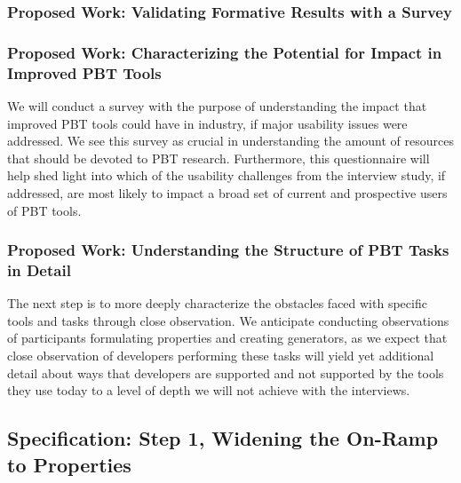 
\subsubsection{Proposed Work: Validating Formative Results with a Survey}

\subsubsection{Proposed Work: Characterizing the Potential for Impact in Improved PBT Tools}
We will conduct a survey with the purpose of understanding the impact that
improved PBT tools could have in industry, if major usability issues were
addressed. We see this survey as crucial in understanding the amount of
resources that should be devoted to PBT research. Furthermore, this
questionnaire will help shed light into which of the usability challenges from
the interview study, if addressed, are most likely to impact a broad set of
current and prospective users of PBT tools.

\subsubsection{Proposed Work: Understanding the Structure of PBT Tasks in Detail}
The next step is to more deeply characterize the obstacles faced with specific
tools and tasks through close observation. We anticipate conducting observations
of participants formulating properties and creating generators, as we expect
that close observation of developers performing these tasks will yield yet
additional detail about ways that developers are supported and not supported by
the tools they use today to a level of depth we will not achieve with the
interviews.

\subsection{Specification: Step 1, Widening the On-Ramp to Properties }
